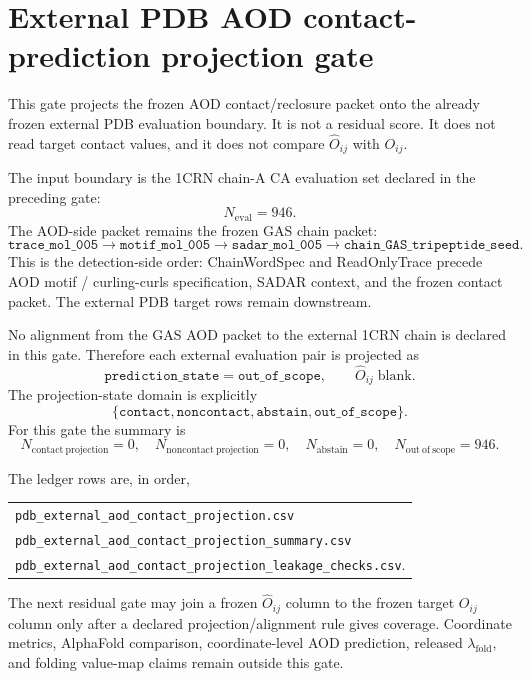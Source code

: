 
\section{External PDB AOD contact-prediction projection gate}

This gate projects the frozen AOD contact/reclosure packet onto the already frozen external PDB evaluation boundary. It is not a residual score. It does not read target contact values, and it does not compare \(\widehat O_{ij}\) with \(O_{ij}\).

The input boundary is the 1CRN chain-A CA evaluation set declared in the preceding gate:
\[
N_{\mathrm{eval}}=946.
\]
The AOD-side packet remains the frozen GAS chain packet:
\[
\texttt{trace\_mol\_005}\to\texttt{motif\_mol\_005}\to
\texttt{sadar\_mol\_005}\to\texttt{chain\_GAS\_tripeptide\_seed}.
\]
This is the detection-side order: ChainWordSpec and ReadOnlyTrace precede AOD motif / curling-curls specification, SADAR context, and the frozen contact packet. The external PDB target rows remain downstream.

No alignment from the GAS AOD packet to the external 1CRN chain is declared in this gate. Therefore each external evaluation pair is projected as
\[
\texttt{prediction\_state}=\texttt{out\_of\_scope},
\qquad
\widehat O_{ij}\;\text{blank}.
\]
The projection-state domain is explicitly
\[
\{\texttt{contact},\texttt{noncontact},\texttt{abstain},\texttt{out\_of\_scope}\}.
\]
For this gate the summary is
\[
N_{\mathrm{contact\ projection}}=0,
\quad
N_{\mathrm{noncontact\ projection}}=0,
\quad
N_{\mathrm{abstain}}=0,
\quad
N_{\mathrm{out\ of\ scope}}=946.
\]

The ledger rows are, in order,
\begin{center}\small
\begin{tabular}{l}
\texttt{pdb\_external\_aod\_contact\_projection.csv}\\
\texttt{pdb\_external\_aod\_contact\_projection\_summary.csv}\\
\texttt{pdb\_external\_aod\_contact\_projection\_leakage\_checks.csv}.
\end{tabular}
\end{center}
The next residual gate may join a frozen \(\widehat O_{ij}\) column to the frozen target \(O_{ij}\) column only after a declared projection/alignment rule gives coverage. Coordinate metrics, AlphaFold comparison, coordinate-level AOD prediction, released \(\lambda_{\mathrm{fold}}\), and folding value-map claims remain outside this gate.
